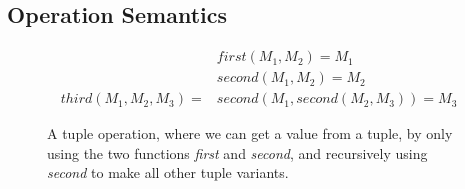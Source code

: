 \subsection{Operation Semantics}

\begin{figure}
\begin{center}
\begin{align*}
&first(M_1,M_2)=M_1\\
&second(M_1,M_2)=M_2\\
third(M_1,M_2,M_3)=&second(M_1,second(M_2,M_3))=M_3
\end{align*}
\end{center}
\caption{A tuple operation, where we can get a value from a tuple, by only using the two functions \textit{first} and \textit{second}, and recursively using \textit{second} to make all other tuple variants.}
\end{figure}

\FloatBarrier
